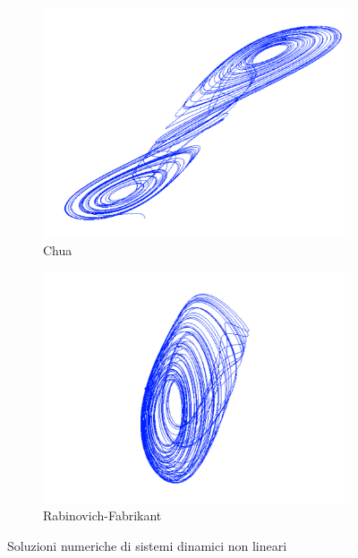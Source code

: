\begin{figure}[H]
 \quad
 \begin{subfigure}[b]{0.5\textwidth}
  \centering
  \includegraphics[width=\textwidth]{chua}
  \caption{Chua}
  \label{fig:chua}
 \end{subfigure}
 \begin{subfigure}[b]{0.5\textwidth}
  \centering
  \includegraphics[width=\textwidth]{rf}
  \caption{Rabinovich-Fabrikant}
  \label{fig:rf}
 \end{subfigure}

 \caption{Soluzioni numeriche di sistemi dinamici non lineari}\label{fig:systems}
\end{figure}

